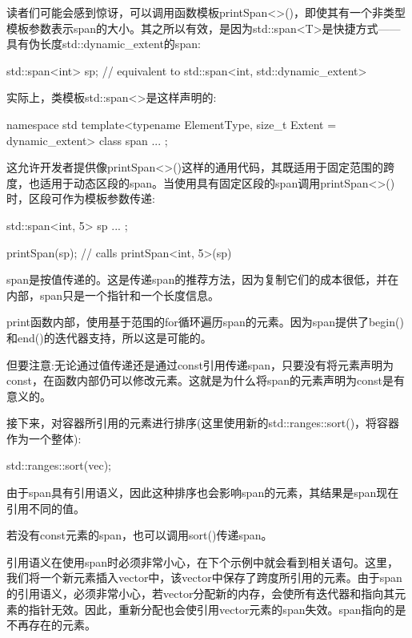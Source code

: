 读者们可能会感到惊讶，可以调用函数模板printSpan<>()，即使其有一个非类型模板参数表示span的大小。其之所以有效，是因为std::span<T>是快捷方式——具有伪长度std::dynamic\_extent的span:

\begin{cpp}
std::span<int> sp; // equivalent to std::span<int, std::dynamic_extent>
\end{cpp}

实际上，类模板std::span<>是这样声明的:

\begin{cpp}
namespace std {
	template<typename ElementType, size_t Extent = dynamic_extent>
	class span {
		...
	};
}
\end{cpp}

这允许开发者提供像printSpan<>()这样的通用代码，其既适用于固定范围的跨度，也适用于动态区段的span。当使用具有固定区段的span调用printSpan<>()时，区段可作为模板参数传递:

\begin{cpp}
std::span<int, 5> sp{ ... };

printSpan(sp); // calls printSpan<int, 5>(sp)
\end{cpp}

span是按值传递的。这是传递span的推荐方法，因为复制它们的成本很低，并在内部，span只是一个指针和一个长度信息。

print函数内部，使用基于范围的for循环遍历span的元素。因为span提供了begin()和end()的迭代器支持，所以这是可能的。

但要注意:无论通过值传递还是通过const引用传递span，只要没有将元素声明为const，在函数内部仍可以修改元素。这就是为什么将span的元素声明为const是有意义的。


接下来，对容器所引用的元素进行排序(这里使用新的std::ranges::sort()，将容器作为一个整体):

\begin{cpp}
std::ranges::sort(vec);
\end{cpp}

由于span具有引用语义，因此这种排序也会影响span的元素，其结果是span现在引用不同的值。

若没有const元素的span，也可以调用sort()传递span。

引用语义在使用span时必须非常小心，在下个示例中就会看到相关语句。这里，我们将一个新元素插入vector中，该vector中保存了跨度所引用的元素。由于span的引用语义，必须非常小心，若vector分配新的内存，会使所有迭代器和指向其元素的指针无效。因此，重新分配也会使引用vector元素的span失效。span指向的是不再存在的元素。

